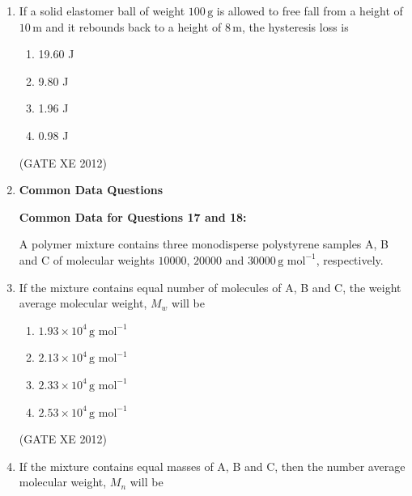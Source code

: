 \documentclass[12pt]{article}
\begin{document}
\begin{enumerate}
\begin{multicols}{2}
\begin{enumerate}
\item P-1, Q-2, R-3, S-4
\item P-2, Q-4, R-1, S-3
\item P-2, Q-1, R-4, S-3
\item P-4, Q-1, R-2, S-3
\end{enumerate}
\end{multicols}
(GATE XE 2012)

\item If a solid elastomer ball of weight $100 \, \text{g}$ is allowed to free fall from a height of $10 \, \text{m}$ and it rebounds back to a height of $8 \, \text{m}$, the hysteresis loss is  

\begin{multicols}{4}
\begin{enumerate}
\item 19.60 J
\item 9.80 J
\item 1.96 J
\item 0.98 J
\end{enumerate}
\end{multicols}
(GATE XE 2012)


\item[]  {\large \textbf{Common Data Questions}  }

\noindent \textbf{Common Data for Questions 17 and 18:}  

A polymer mixture contains three monodisperse polystyrene samples A, B and C of molecular weights $10000$, $20000$ and $30000 \, \text{g mol}^{-1}$, respectively.  


\item If the mixture contains equal number of molecules of A, B and C, the weight average molecular weight, $M_w$ will be  

\begin{multicols}{2}
\begin{enumerate}
\item $1.93 \times 10^4 \, \text{g mol}^{-1}$
\item $2.13 \times 10^4 \, \text{g mol}^{-1}$
\item $2.33 \times 10^4 \, \text{g mol}^{-1}$
\item $2.53 \times 10^4 \, \text{g mol}^{-1}$
\end{enumerate}
\end{multicols}
(GATE XE 2012)

\item If the mixture contains equal masses of A, B and C, then the number average molecular weight, $M_n$ will be  


\end{enumerate}
\end{document}
